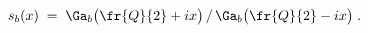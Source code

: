 \begin{equation}\label{sbdef}
s_b(x)\;=\;\Ga_b\big(\fr{Q}{2}+ix\big)\,/\,\Ga_b\big(\fr{Q}{2}-ix\big)\;.
\end{equation}

